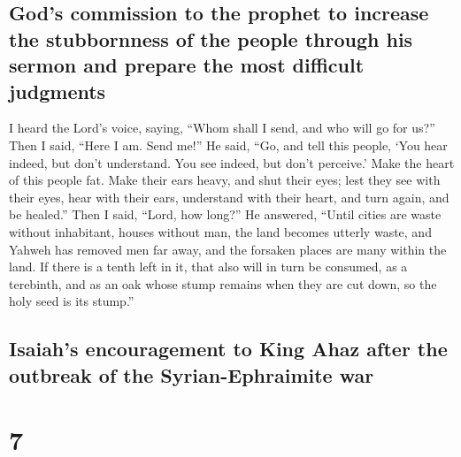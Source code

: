 \hypertarget{gods-commission-to-the-prophet-to-increase-the-stubbornness-of-the-people-through-his-sermon-and-prepare-the-most-difficult-judgments}{%
\subsection{God's commission to the prophet to increase the stubbornness
of the people through his sermon and prepare the most difficult
judgments}\label{gods-commission-to-the-prophet-to-increase-the-stubbornness-of-the-people-through-his-sermon-and-prepare-the-most-difficult-judgments}}

 I heard the Lord's voice, saying, ``Whom shall I send,
and who will go for us?'' Then I said, ``Here I am. Send me!''
 He said, ``Go, and tell this people, `You hear indeed,
but don't understand. You see indeed, but don't perceive.'
 Make the heart of this people fat. Make their ears
heavy, and shut their eyes; lest they see with their eyes, hear with
their ears, understand with their heart, and turn again, and be
healed.''  Then I said, ``Lord, how long?'' He answered,
``Until cities are waste without inhabitant, houses without man, the
land becomes utterly waste,  and Yahweh has removed men
far away, and the forsaken places are many within the land.
 If there is a tenth left in it, that also will in turn
be consumed, as a terebinth, and as an oak whose stump remains when they
are cut down, so the holy seed is its stump.''

\hypertarget{isaiahs-encouragement-to-king-ahaz-after-the-outbreak-of-the-syrian-ephraimite-war}{%
\subsection{Isaiah's encouragement to King Ahaz after the outbreak of
the Syrian-Ephraimite
war}\label{isaiahs-encouragement-to-king-ahaz-after-the-outbreak-of-the-syrian-ephraimite-war}}

\hypertarget{section-6}{%
\section{7}\label{section-6}}

